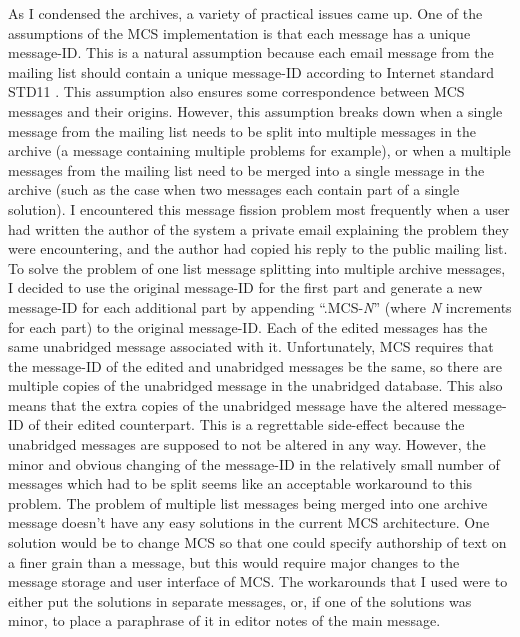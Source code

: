 As I condensed the archives, a variety of practical issues came up. One of the
assumptions of the MCS implementation is that each message has a unique
message-ID. This is a natural assumption because each email message from the
mailing list should contain a unique message-ID according to Internet standard
STD11 \cite{std-email}. This assumption also ensures some correspondence
between MCS messages and their origins. However, this assumption breaks down
when a single message from the mailing list needs to be split into multiple
messages in the archive (a message containing multiple problems for example),
or when a multiple messages from the mailing list need to be merged into a
single message in the archive (such as the case when two messages each contain
part of a single solution). I encountered this message fission problem most
frequently when a user had written the author of the system a private email
explaining the problem they were encountering, and the author had copied his
reply to the public mailing list. To solve the problem of one list message
splitting into multiple archive messages, I decided to use the original
message-ID for the first part and generate a new message-ID for each additional
part by appending ``.MCS-{\it N}'' (where {\it N} increments for each part) to
the original message-ID.  Each of the edited messages has the same unabridged
message associated with it.  Unfortunately, MCS requires that the message-ID of
the edited and unabridged messages be the same, so there are multiple copies of
the unabridged message in the unabridged database. This also means that the
extra copies of the unabridged message have the altered message-ID of their
edited counterpart.  This is a regrettable side-effect because the unabridged
messages are supposed to not be altered in any way.  However, the minor and
obvious changing of the message-ID in the relatively small number of messages
which had to be split seems like an acceptable workaround to this problem. The
problem of multiple list messages being merged into one archive message doesn't
have any easy solutions in the current MCS architecture. One solution would be
to change MCS so that one could specify authorship of text on a finer grain
than a message, but this would require major changes to the message storage and
user interface of MCS. The workarounds that I used were to either put the
solutions in separate messages, or, if one of the solutions was minor, to place
a paraphrase of it in editor notes of the main message.

